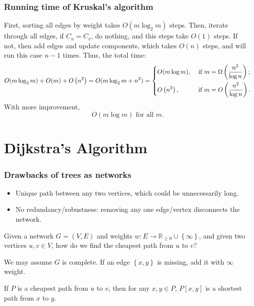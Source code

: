 \subsubsection{Running time of Kruskal's algorithm}
First, sorting all edges by weight takes \(O(m \log _2 m)\) steps. Then, iterate through all edges, if \(C_u = C_v\), do nothing, and this steps take \(O(1)\) steps. If not, then add edges and update components, which takes \(O(n)\) steps, and will run this case \(n - 1\) times. Thus, the total time:
\[
    O(m \log _2 m) + O(m) + O\left( n^2 \right) = O(m \log _2 m + n^2) = \begin{dcases}
        O(m \log m), &\text{ if } m = \Omega \left( \frac{n^2}{\log n} \right)  ;\\
        O\left( n^2 \right) , &\text{ if } m = O\left( \frac{n^2}{\log n} \right).
    \end{dcases} 
\]    
With more improvement, 
\[
    O(m \log m) \text{ for all } m. 
\]

\section{Dijkstra's Algorithm}
\subsubsection{Drawbacks of trees as networks}
\begin{itemize}
    \item [(1)] Unique path between any two vertices, which could be unnecessarily long. 
    \item [(2)] No redundancy/robustness: removing any one edge/vertex disconnects the network.
\end{itemize}

\begin{question}
    Given a network \(G = (V, E)\) and weights \(w : E \to \mathbb{R} _{\ge 0} \cup \left\{ \infty \right\} \), and given two vertices \(u, v \in V\), how do we find the cheapest path from \(u\) to \(v\)?     
\end{question}

\begin{observation}
    We may assume \(G\) is complete. If an edge \(\left\{ x, y \right\} \) is missing, add it with \(\infty \) weight.   
\end{observation}

\begin{lemma} \label{lm: cheapest path}
    If \(P\) is a cheapest path from \(u\) to \(v\), then for any \(x, y \in P\), \(P[x, y]\) is a shortest path from \(x\) to \(y\).       
\end{lemma}

